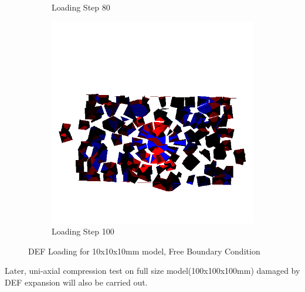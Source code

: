 \begin{figure}[ht!]
\begin{subfigure}{.33\textwidth}
      \caption{Loading Step 80}
      \end{subfigure}%
      \begin{subfigure}{.33\textwidth}
        \centering
        \includegraphics[width=1.0\linewidth]{Files/Small_DEF/Free_IS2/DEP5-STEP(120).png}
        \caption{Loading Step 100}
      \end{subfigure}

  \caption{DEF Loading for 10x10x10mm model, Free Boundary Condition}
  \label{fig:DEF_Loading_s_free}
\end{figure}

Later, uni-axial compression test on full size model(100x100x100mm) damaged by DEF expansion will also be carried out.
